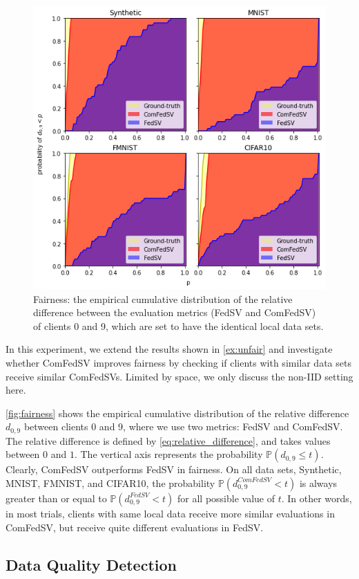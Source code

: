 \begin{figure}[t]
    \centering
    \includegraphics[width=.8\textwidth]{./figures/equal_data.png}
    \caption{Fairness: the empirical cumulative distribution of the relative difference between the evaluation metrics (FedSV and ComFedSV) of clients 0 and 9, which are set to have the identical local data sets.}
    \label{fig:fairness}
\end{figure}

In this experiment, we extend the results shown in \autoref{ex:unfair} and investigate whether ComFedSV improves fairness by checking if clients with similar data sets receive similar ComFedSVs. Limited by space, we only discuss the non-IID setting here.

\autoref{fig:fairness} shows the empirical cumulative distribution of the relative difference $d_{0,9}$ between clients 0 and 9, where we use two metrics: FedSV and ComFedSV. The relative difference is defined by \eqref{eq:relative_difference}, and takes values between $0$ and $1$. The vertical axis represents the probability $\mathbb{P}(d_{0,9} \leq t)$. Clearly, ComFedSV outperforms FedSV in fairness. On all data sets, Synthetic, MNIST, FMNIST, and CIFAR10, the probability $\mathbb{P}(d_{0,9}^{ComFedSV} < t)$ is always greater than or equal to $\mathbb{P}(d_{0,9}^{FedSV} < t)$ for all possible value of $t$. In other words, in most trials, clients with same local data receive more similar evaluations in ComFedSV, but receive quite different evaluations in FedSV.

\subsection{Data Quality Detection} \label{sec:7-7-3}

